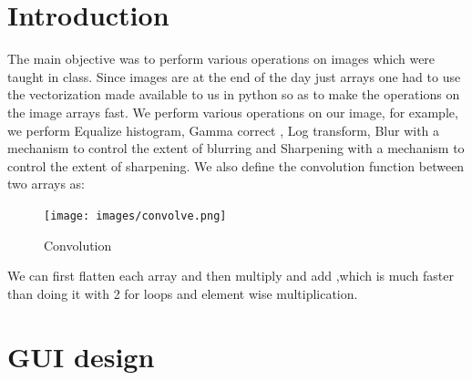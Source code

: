 \documentclass[conference]{IEEEtran}
\begin{document}
{{\section{Introduction}
The main objective was to perform various operations on images which were taught in class. Since images are at the end of the day just arrays one had to use the vectorization made available to us in python so as to make the operations on the image arrays fast. We perform various operations on our image, for example, we perform Equalize histogram, Gamma correct , Log transform,  Blur with a mechanism to control the extent of blurring and Sharpening with a mechanism to control the extent of sharpening.
\newline We also define the convolution function between two arrays as:
\begin{figure}[htbp]
\centerline{\texttt{[image: images/convolve.png]}}
\caption{Convolution}
\label{fig:gui_1}
\end{figure}
We can first flatten each array and then  multiply and add ,which is much faster than doing it with 2 for loops and element wise multiplication.
\section{ GUI design}

}}
\end{document}
